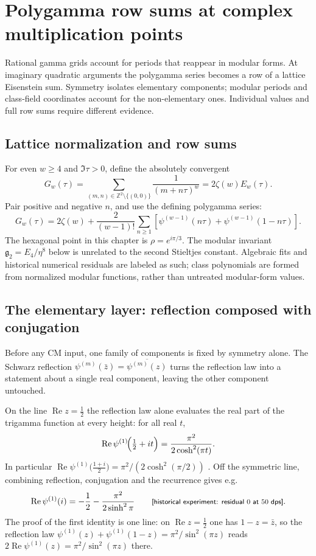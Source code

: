 \chapter{Polygamma row sums at complex multiplication points}
\label{ch:06-cm}

Rational gamma grids account for periods that reappear in modular forms.
At imaginary quadratic arguments the polygamma series becomes a row of a
lattice Eisenstein sum. Symmetry isolates elementary components; modular
periods and class-field coordinates account for the non-elementary ones.
Individual values and full row sums require different evidence.

\section{Lattice normalization and row sums}
For even $w\ge4$ and $\Im\tau>0$, define the absolutely convergent
\[
G_w(\tau)=\sum_{(m,n)\in\mathbb Z^2\setminus\{(0,0)\}}
\frac1{(m+n\tau)^w}=2\zeta(w)E_w(\tau).
\]
Pair positive and negative $n$, and use the defining polygamma series:
\begin{equation}\label{cm:eq:rowsum}
G_w(\tau)=2\zeta(w)+\frac2{(w-1)!}
\sum_{n\ge1}\left[\psi^{(w-1)}(n\tau)+\psi^{(w-1)}(1-n\tau)\right].
\end{equation}
The hexagonal point in this chapter is $\rho=e^{i\pi/3}$.
The modular invariant $\mathfrak g_2=E_4/\eta^8$ below is unrelated to the
second Stieltjes constant. Algebraic fits and historical numerical
residuals are labeled as such; class polynomials are formed from normalized
modular functions, rather than untreated modular-form values.

\section{The elementary layer: reflection composed with conjugation}\label{cm:sec:elementary}

Before any CM input, one family of components is fixed by symmetry alone. The Schwarz
reflection $\psi^{(m)}(\bar z)=\overline{\psi^{(m)}(z)}$ turns the reflection law into a
statement about a single real component, leaving the other component untouched.

\begin{result}\label{cm:res:line}
On the line $\operatorname{Re}z=\tfrac12$ the reflection law alone evaluates the real part of
the trigamma function at every height: for all real $t$,
\[
\operatorname{Re}\psi^{(1)}\!\Bigl(\tfrac12+it\Bigr)=\frac{\pi^2}{2\cosh^2(\pi t)} .
\]
In particular $\operatorname{Re}\psi^{(1)}\!\bigl(\tfrac{1+i}{2}\bigr)=\pi^2/(2\cosh^2(\pi/2))$
. Off the symmetric line, combining reflection, conjugation and
the recurrence gives e.g.
\[
\operatorname{Re}\psi^{(1)}(i)=-\frac12-\frac{\pi^2}{2\sinh^2\pi}
\qquad\text{\textsf{\footnotesize[historical experiment: residual $0$ at $50$ dps]}.}
\]
The proof of the first identity is one line: on $\operatorname{Re}z=\tfrac12$ one has
$1-z=\bar z$, so the reflection law
$\psi^{(1)}(z)+\psi^{(1)}(1-z)=\pi^2/\sin^2(\pi z)$ reads
$2\operatorname{Re}\psi^{(1)}(z)=\pi^2/\sin^2(\pi z)$ there.
\end{result}

